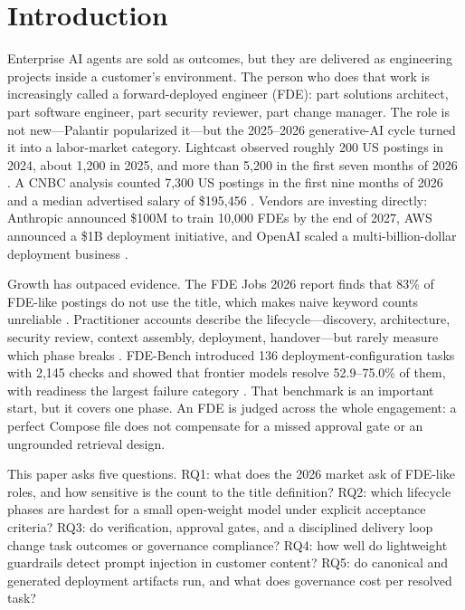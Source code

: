\documentclass[11pt]{article}
\begin{document}
\section{Introduction}
Enterprise AI agents are sold as outcomes, but they are delivered as engineering projects inside a customer's environment. The person who does that work is increasingly called a forward-deployed engineer (FDE): part solutions architect, part software engineer, part security reviewer, part change manager. The role is not new---Palantir popularized it---but the 2025--2026 generative-AI cycle turned it into a labor-market category. Lightcast observed roughly 200 US postings in 2024, about 1,200 in 2025, and more than 5,200 in the first seven months of 2026 \citep{lightcast2026}. A CNBC analysis counted 7,300 US postings in the first nine months of 2026 and a median advertised salary of \$195,456 \citep{cnbc2026}. Vendors are investing directly: Anthropic announced \$100M to train 10,000 FDEs by the end of 2027, AWS announced a \$1B deployment initiative, and OpenAI scaled a multi-billion-dollar deployment business \citep{cnbc2026}.

Growth has outpaced evidence. The FDE Jobs 2026 report finds that 83\% of FDE-like postings do not use the title, which makes naive keyword counts unreliable \citep{fdejobs2026}. Practitioner accounts describe the lifecycle---discovery, architecture, security review, context assembly, deployment, handover---but rarely measure which phase breaks \citep{cio2026}. FDE-Bench introduced 136 deployment-configuration tasks with 2,145 checks and showed that frontier models resolve 52.9--75.0\% of them, with readiness the largest failure category \citep{fdebench2026}. That benchmark is an important start, but it covers one phase. An FDE is judged across the whole engagement: a perfect Compose file does not compensate for a missed approval gate or an ungrounded retrieval design.

This paper asks five questions. RQ1: what does the 2026 market ask of FDE-like roles, and how sensitive is the count to the title definition? RQ2: which lifecycle phases are hardest for a small open-weight model under explicit acceptance criteria? RQ3: do verification, approval gates, and a disciplined delivery loop change task outcomes or governance compliance? RQ4: how well do lightweight guardrails detect prompt injection in customer content? RQ5: do canonical and generated deployment artifacts run, and what does governance cost per resolved task?
\end{document}
